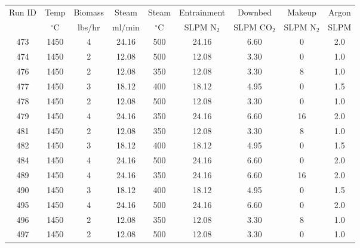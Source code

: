 \documentclass[11pt,twocolumn]{article}
\begin{document}
\begin{center}
\begin{tabular}{ccccccccc}
	Run ID &  Temp 		&  Biomass 	&  Steam 	&  Steam 		&  Entrainment & Downbed	 & 	Makeup	&	Argon \\
	{}       & $^\circ$C	& lbs/hr		& ml/min	& $^\circ$C	& SLPM N$_2$	& SLPM CO$_2$	 & 	SLPM N$_2$ & SLPM \\
	\hline
	473    &       1450 &             4 &     24.16 &       500 &       24.16 &               6.60 &            0 &         2.0 \\
	474    &       1450 &             2 &     12.08 &       500 &       12.08 &               3.30 &            0 &         1.0 \\
	476    &       1450 &             2 &     12.08 &       350 &       12.08 &               3.30 &            8 &         1.0 \\
	477    &       1450 &             3 &     18.12 &       400 &       18.12 &               4.95 &            0 &         1.5 \\
	478    &       1450 &             2 &     12.08 &       500 &       12.08 &               3.30 &            0 &         1.0 \\
	479    &       1450 &             4 &     24.16 &       350 &       24.16 &               6.60 &           16 &         2.0 \\
	481    &       1450 &             2 &     12.08 &       350 &       12.08 &               3.30 &            8 &         1.0 \\
	482    &       1450 &             3 &     18.12 &       400 &       18.12 &               4.95 &            0 &         1.5 \\
	484    &       1450 &             4 &     24.16 &       500 &       24.16 &               6.60 &            0 &         2.0 \\
	489    &       1450 &             4 &     24.16 &       350 &       24.16 &               6.60 &           16 &         2.0 \\
	490    &       1450 &             3 &     18.12 &       400 &       18.12 &               4.95 &            0 &         1.5 \\
	495    &       1450 &             4 &     24.16 &       500 &       24.16 &               6.60 &            0 &         2.0 \\
	496    &       1450 &             2 &     12.08 &       350 &       12.08 &               3.30 &            8 &         1.0 \\
	497    &       1450 &             2 &     12.08 &       500 &       12.08 &               3.30 &            0 &         1.0 \\

\end{tabular}
\end{center}
\end{document}
